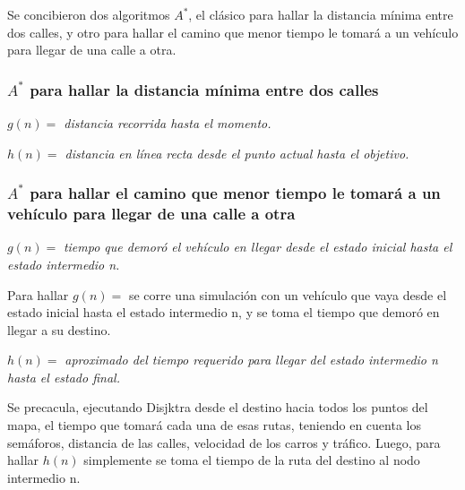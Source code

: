 \documentclass[colorinlistoftodos,twoside,twocolumn]{article} %
\begin{document}
	Se concibieron dos algoritmos $ A^{*} $, el cl\'asico para hallar la distancia m\'inima entre dos calles, y otro para hallar el camino que menor tiempo le tomar\'a a un veh\'iculo para llegar de una calle a otra.
	
	\subsubsection{$ A^{*} $ para hallar la distancia m\'inima entre dos calles}
	
	\begin{center}
	
	\textit{$ g(n) = $ distancia recorrida hasta el momento.}
	
	\vspace{0.5em}
	\textit{$ h(n) = $ distancia en l\'inea recta desde el punto actual hasta el objetivo.}
	
	\end{center}
	
	\subsubsection{$ A^{*} $ para hallar el camino que menor tiempo le tomar\'a a un veh\'iculo para llegar de una calle a otra}
	
	\begin{center}
		\textit{$ g(n) = $ } \textit{tiempo que demor\'o el veh\'iculo en llegar desde el estado inicial hasta el \hspace{8em} estado intermedio n.}
	\end{center}	
	Para hallar $ g(n) = $ se corre una simulaci\'on con un veh\'iculo que vaya desde el estado inicial hasta el estado intermedio n, y se toma el tiempo que demor\'o en llegar a su destino. 
		
	\begin{center}
		\vspace{0.5em}
		\textit{$ h(n) = $ } \textit{aproximado del tiempo requerido para llegar del estado intermedio n \hspace{8em} hasta el estado final.}
	\end{center}

	Se precacula, ejecutando Disjktra desde el destino hacia todos los puntos del mapa, el tiempo que tomar\'a cada una de esas rutas, teniendo en cuenta los sem\'aforos, distancia de las calles, velocidad de los carros y tr\'afico. Luego, para hallar $ h(n) $ simplemente se toma el tiempo de la ruta del destino al nodo intermedio n.
	
\end{document}

